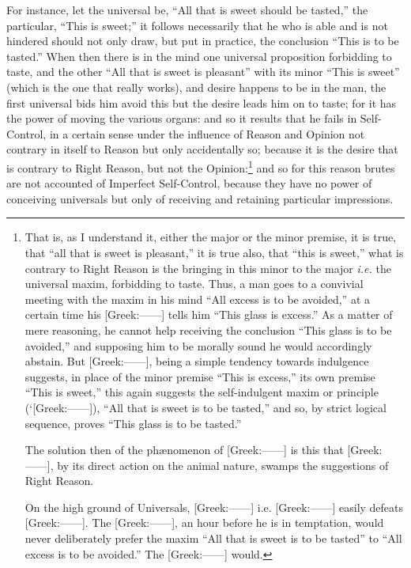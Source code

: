 For instance, let the universal be, “All that is sweet should be
tasted,” the particular, “This is sweet;” it follows
necessarily that he who is able and is not hindered should not only draw, but
put in practice, the conclusion “This is to be tasted.” When then
there is in the mind one universal proposition forbidding to taste, and the
other “All that is sweet is pleasant” with its minor “This is
sweet” (which is the one that really works), and desire happens to be in
the man, the first universal bids him avoid this but the desire leads him on to
taste; for it has the power of moving the various organs: and so it results
that he fails in Self-Control, in a certain sense under the influence of Reason
and Opinion not contrary in itself to Reason but only accidentally so; because
it is the desire that is contrary to Right Reason, but not the
Opinion:\footnote{That is, as I understand it, either the major or the minor premise, it is true,
that “all that is sweet is pleasant,” it is true also, that
“this is sweet,” what is contrary to Right Reason is the bringing
in this minor to the major \emph{i.e.} the universal maxim, forbidding to
taste. Thus, a man goes to a convivial meeting with the maxim in his mind
“All excess is to be avoided,” at a certain time his
[Greek:——] tells him “This glass is excess.” As a
matter of mere reasoning, he cannot help receiving the conclusion “This
glass is to be avoided,” and supposing him to be morally sound he would
accordingly abstain. But [Greek:——], being a simple tendency
towards indulgence suggests, in place of the minor premise “This is
excess,” its own premise “This is sweet,” this again suggests
the self-indulgent maxim or principle (‘[Greek:——]),
“All that is sweet is to be tasted,” and so, by strict logical
sequence, proves “This glass is to be tasted.”

The solution then of the phænomenon of [Greek:——] is this that
[Greek:——], by its direct action on the animal nature, swamps the
suggestions of Right Reason.

On the high ground of Universals, [Greek:——] i.e.
[Greek:——] easily defeats [Greek:——]. The
[Greek:——], an hour before he is in temptation, would never
deliberately prefer the maxim “All that is sweet is to be tasted”
to “All excess is to be avoided.” The [Greek:——] would.}
and so for this reason brutes are not accounted of Imperfect Self-Control,
because they have no power of conceiving universals but only of receiving and
retaining particular impressions.

